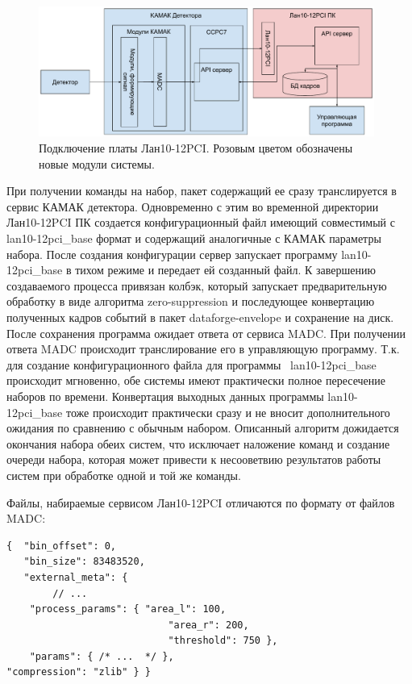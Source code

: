 \documentclass[a4paper,14pt]{extreport}
\begin{document}
\begin{figure}
  \centering
  \includegraphics[width = 0.98\textwidth]{img/nu_mass_setup/lan10-integration.pdf}
    \caption{Подключение платы Лан10-12PCI. Розовым цветом обозначены новые модули системы.}
    \label{fig:numass-lan10-workflow}
\end{figure}
При получении команды на набор, пакет содержащий ее сразу транслируется в сервис КАМАК детектора. Одновременно с этим во временной директории Лан10-12PCI ПК создается конфигурационный файл имеющий совместимый с lan10-12pci\_base формат и содержащий аналогичные с КАМАК параметры набора. После создания конфигурации сервер запускает программу lan10-12pci\_base в тихом режиме и передает ей созданный файл. К завершению создаваемого процесса привязан колбэк, который запускает предварительную обработку в виде алгоритма zero-suppression и последующее конвертацию полученных кадров событий в пакет dataforge-envelope и сохранение на диск. После сохранения программа ожидает ответа от сервиса MADC. При получении ответа MADC происходит транслирование его в управляющую программу. Т.к. для создание конфигурационного файла для программы ~lan10-12pci\_base происходит мгновенно, обе системы имеют практически полное пересечение наборов по времени. Конвертация выходных данных программы lan10-12pci\_base тоже происходит практически сразу и не вносит дополнительного ожидания по сравнению с обычным набором. Описанный алгоритм дожидается окончания набора обеих систем, что исключает наложение команд и создание очереди набора, которая может привести к несооветвию результатов работы систем при обработке одной и той же команды.

Файлы, набираемые сервисом Лан10-12PCI отличаются по формату от файлов MADC:
\begin{lstlisting}[caption={Сообщение с набранными платой Лан10-12PCI событиями.}, captionpos=b]
{  "bin_offset": 0,
   "bin_size": 83483520,
   "external_meta": {
        // ...
    "process_params": { "area_l": 100,
                            "area_r": 200,
                            "threshold": 750 },
    "params": { /* ...  */ },
"compression": "zlib" } }
\end{lstlisting}
\end{document}
